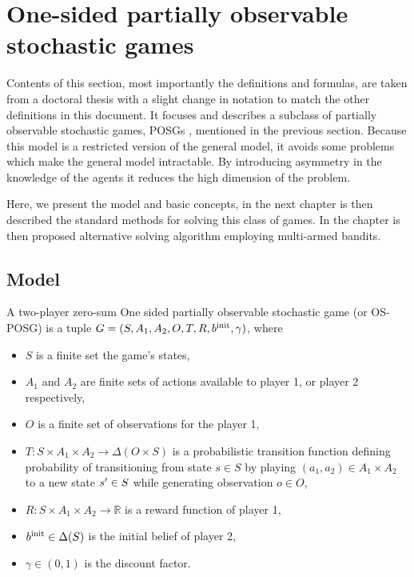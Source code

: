 \documentclass[../main.tex]{subfiles}
\begin{document}
\section{One-sided partially observable stochastic games}\label{bg:osposg}
Contents of this section, most importantly the definitions and formulas, are taken from a doctoral thesis \cite{osposgs} with a slight change in notation to match the other definitions in this document.
It focuses and describes a subclass of partially observable stochastic games, POSGs , mentioned in the previous section.
Because this model is a restricted version of the general model, it avoids some problems which make the general model intractable.
By introducing asymmetry in the knowledge of the agents it reduces the high dimension of the problem.

Here, we present the model and basic concepts, in the next chapter  is then described the standard methods for solving this class of games.
In the chapter  is then proposed alternative solving algorithm employing multi-armed bandits.

\subsection{Model}\label{bg:osposg:model}
\begin{definition}\label{bg:osposg:model:def}
    A two-player zero-sum One sided partially observable stochastic game (or OS-POSG) is a tuple $G = \left(S, A_1, A_2, O, T, R, b^{\text{init}}, \gamma\right)$, where
    \begin{itemize}
        \item $S$ is a finite set the game's states,
        \item $A_1$ and $A_2$ are finite sets of actions available to player 1, or player 2 respectively,
        \item $O$ is a finite set of observations for the player 1,
        \item $T: S \times A_1 \times A_2 \to \Delta(O \times S)$ is a probabilistic transition function defining probability of transitioning from state $s \in S$ by playing $\left(a_1, a_2\right) \in A_1 \times A_2$ to a new state $s^{\prime} \in S$ while generating observation $o \in O$,
        \item $R: S \times A_1 \times A_2 \to \mathbb{R}$ is a reward function of player 1,
        \item $b^{\text{init}} \in \Delta(S)$ is the initial belief of player 2,
        \item $\gamma \in \left(0, 1\right)$ is the discount factor.
    \end{itemize}
\end{definition}
\end{document}
